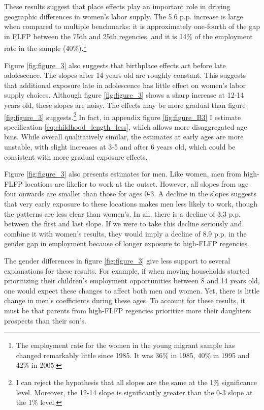 These results suggest that place effects play an important role in driving geographic differences in women's labor supply. The 5.6 p.p. increase is large when compared to multiple benchmarks: it is approximately one-fourth of the gap in FLFP between the 75th and 25th regencies, and it is 14\% of the employment rate in the sample (40\%).\footnote{The employment rate for the women in the young migrant sample has changed remarkably little since 1985. It was 36\% in 1985, 40\% in 1995 and 42\% in 2005.}

Figure \ref{fig:figure_3} also suggests that birthplace effects act before late adolescence. The slopes after 14 years old are roughly constant. This suggests that additional exposure late in adolescence has little effect on women's labor supply choices. Although figure \ref{fig:figure_3} shows a sharp increase at 12-14 years old, these slopes are noisy. The effects may be more gradual than figure \ref{fig:figure_3} suggests.\footnote{I can reject the hypothesis that all slopes are the same at the 1\% significance level. Moreover, the 12-14 slope is significantly greater than the 0-3 slope at the 1\% level.} In fact, in appendix figure \ref{fig:figure_B3} I estimate specification \eqref{eq:childhood_length_less}, which allows more disaggregated age bins. While overall qualitatively similar, the estimates at early ages are more unstable, with slight increases at 3-5 and after 6 years old, which could be consistent with more gradual exposure effects. 

Figure \ref{fig:figure_3} also presents estimates for men. Like women, men from high-FLFP locations are likelier to work at the outset. However, all slopes from age four onwards are smaller than those for ages 0-3. A decline in the slopes suggests that very early exposure to these locations makes men less likely to work, though the patterns are less clear than women's. In all, there is a decline of 3.3 p.p. between the first and last slope. If we were to take this decline seriously and combine it with women's results, they would imply a decline of 8.9 p.p. in the gender gap in employment because of longer exposure to high-FLFP regencies.

The gender differences in figure  \ref{fig:figure_3} give less support to several explanations for these results. For example, if when moving households started prioritizing their children's employment opportunities between 8 and 14 years old, one would expect these changes to affect both men and women. Yet, there is little change in men's coefficients during these ages. To account for these results, it must be that parents from high-FLFP regencies prioritize more their daughters prospects than their son's. 


